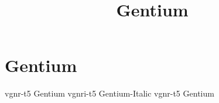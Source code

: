 \documentclass[sample]{vnsample}
\title{Gentium}
\begin{document}
\section{Gentium}
  {vgnr-t5}  {Gentium}
 {vgnri-t5} {Gentium-Italic}
  {vgnr-t5}  {Gentium}
\end{document}
